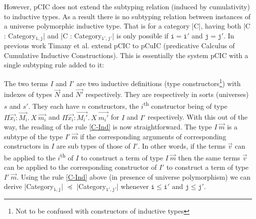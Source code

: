 \documentclass{easychair}
\begin{document}
However, pCIC does not extend the subtyping relation (induced by
cumulativity) to inductive types. As a result there is no subtyping
relation between instances of a universe polymorphic inductive type.
That is for a category \Coqe|C|, having both
\Coqe|C : Category$_{\mathtt{i, j}}$| and \Coqe|C : Category$_{\mathtt{i', j'}}$|
is only possible if $\mathtt{i = i'}$ and $\mathtt{j = j'}$.
In previous work Timany et al. \cite{DBLP:conf/ictac/Timany015} extend
pCIC to pCuIC (predicative Calculus of Cumulative Inductive
Constructions). This is essentially the system pCIC with a single
subtyping rule added to it:\footnotemark{}
\begin{mathpar}
\end{mathpar}
%
The two terms $I$ and $I'$ are two inductive definitions (type
constructors\footnote{Not to be confused with constructors of
  inductive types}) with indexes of types $\vec{N}$ and $\vec{N'}$
respectively. They are respectively in sorts (universes) $s$ and $s'$.
They each have $n$ constructors, the $i$\textsuperscript{th}
constructor being of type $\Pi\vec{x_i} : \vec{M_i}.~X~\vec{m_i}$
and $\Pi\vec{x_i} : \vec{M_i'}.~X~\vec{m_i'}$ for $I$ and $I'$
respectively. With this out of the way, the reading of the rule
\ref{C-Ind} is now straightforward. The type $I~\vec{m}$ is a subtype
of the type $I'~\vec{m}$ if the corresponding arguments of
corresponding constructors in $I$ are sub types of those of $I'$.  In
other words, if the terms $\vec{v}$ can be applied to the
$i$\textsuperscript{th} of $I$ to construct a term of type $I~\vec{m}$
then the same terms $\vec{v}$ can be applied to the corresponding
constructor of $I'$ to construct a term of type $I'~\vec{m}$.  %
Using the rule \ref{C-Ind} above (in presence of universe polymorphism)
we can derive
\Coqe|Category$_{\mathtt{i, j}}$| $\preceq$ \Coqe|Category$_{\mathtt{i', j'}}$|
whenever $\mathtt{i \le i'}$ and $\mathtt{j \le j'}$.
\end{document}
